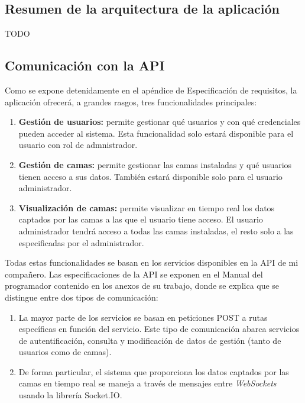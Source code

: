 \subsection{Resumen de la arquitectura de la aplicación}

TODO

\subsection{Comunicación con la API}

Como se expone detenidamente en el apéndice de Especificación de requisitos, la aplicación ofrecerá, a grandes rasgos, tres funcionalidades principales: 

\begin{enumerate}
	\item \textbf{Gestión de usuarios:} permite gestionar qué usuarios y con qué credenciales pueden acceder al sistema. Esta funcionalidad solo estará disponible para el usuario con rol de admnistrador. 
	\item \textbf{Gestión de camas:} permite gestionar las camas instaladas y qué usuarios tienen acceso a sus datos. También estará disponible solo para el usuario administrador. 
	\item \textbf{Visualización de camas:} permite visualizar en tiempo real los datos captados por las camas a las que el usuario tiene acceso. El usuario administrador tendrá acceso a todas las camas instaladas, el resto solo a las especificadas por el administrador. 
\end{enumerate}

Todas estas funcionalidades se basan en los servicios disponibles en la API de mi compañero. Las especificaciones de la API se exponen en el Manual del programador contenido en los anexos de su trabajo, donde se explica que se distingue entre dos tipos de comunicación: 

\begin{enumerate}
	\item La mayor parte de los servicios se basan en peticiones POST a rutas específicas en función del servicio. Este tipo de comunicación abarca servicios de autentificación, consulta y modificación de datos de gestión (tanto de usuarios como de camas). 
	\item De forma particular, el sistema que proporciona los datos captados por las camas en tiempo real se maneja a través de mensajes entre \textit{WebSockets} usando la librería Socket.IO. 
\end{enumerate}

